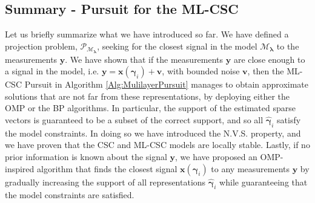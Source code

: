\documentclass[10pt,journal]{IEEEtran}
\def\x{{\mathbf x}}
\def\v{{\mathbf v}}
\def\y{{\mathbf y}}
\def\M{{\mathcal{M}}}
\def\P{{\mathcal{P}}}
\def\gama{{\boldsymbol \gamma}}
\def\lamda{{\boldsymbol \lambda}}
\def\vps{{\bm{\mathbf{\mathcal{E}}}}}
\def\MEP{{\text{M}\vps\text{P}}}
\def\PM{{\P_{\M_\lamda}}}
\theoremstyle{plain}
\theoremstyle{definition}
\begin{document}
\subsection{Summary - Pursuit for the ML-CSC}

Let us briefly summarize what we have introduced so far. We have defined a projection problem, $\PM$, seeking for the closest signal in the model $\M_\lamda$ to the measurements $\y$. We have shown that if the measurements $\y$ are close enough to a signal in the model, i.e. $\y = \x(\gama_i) + \v$, with bounded noise $\v$, then the ML-CSC Pursuit in Algorithm \ref{Alg:MulilayerPursuit} manages to obtain approximate solutions that are not far from these representations, by deploying either the OMP or the BP algorithms. In particular, the support of the estimated sparse vectors is guaranteed to be a subset of the correct support, and so all $\hat{\gama}_i$ satisfy the model constraints. In doing so we have introduced the N.V.S. property, and we have proven that the CSC and ML-CSC models are locally stable. Lastly, if no prior information is known about the signal $\y$, we have proposed an OMP-inspired algorithm that finds the closest signal $\x(\gama_i)$ to any measurements $\y$ by gradually increasing the support of all representations $\hat{\gama}_i$ while guaranteeing that the model constraints are satisfied. %









\end{document}

